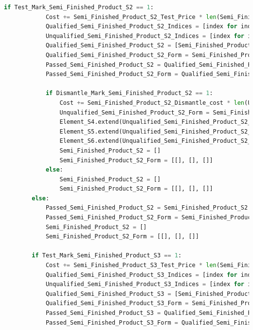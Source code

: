 \documentclass[withoutpreface,bwprint]{cumcmthesis} %
\begin{document}
\begin{appendices}
\begin{lstlisting}[language=python]
		if Test_Mark_Semi_Finished_Product_S2 == 1:
			Cost += Semi_Finished_Product_S2_Test_Price * len(Semi_Finished_Product_S2)
			Qualified_Semi_Finished_Product_S2_Indices = [index for index, value in enumerate(Semi_Finished_Product_S2) if value == 1]
			Unqualified_Semi_Finished_Product_S2_Indices = [index for index, value in enumerate(Semi_Finished_Product_S2) if value == 0]
			Qualified_Semi_Finished_Product_S2 = [Semi_Finished_Product_S2[i] for i in range(len(Semi_Finished_Product_S2)) if i in Qualified_Semi_Finished_Product_S2_Indices]
			Qualified_Semi_Finished_Product_S2_Form = Semi_Finished_Product_S2_Form[:, Qualified_Semi_Finished_Product_S2_Indices]
			Passed_Semi_Finished_Product_S2 = Qualified_Semi_Finished_Product_S2
			Passed_Semi_Finished_Product_S2_Form = Qualified_Semi_Finished_Product_S2_Form
	
			if Dismantle_Mark_Semi_Finished_Product_S2 == 1:
				Cost += Semi_Finished_Product_S2_Dismantle_cost * len(Unqualified_Semi_Finished_Product_S2_Indices)
				Unqualified_Semi_Finished_Product_S2_Form = Semi_Finished_Product_S2_Form[:, Unqualified_Semi_Finished_Product_S2_Indices]
				Element_S4.extend(Unqualified_Semi_Finished_Product_S2_Form[0])
				Element_S5.extend(Unqualified_Semi_Finished_Product_S2_Form[1])
				Element_S6.extend(Unqualified_Semi_Finished_Product_S2_Form[2])
				Semi_Finished_Product_S2 = []
				Semi_Finished_Product_S2_Form = [[], [], []]
			else:
				Semi_Finished_Product_S2 = []
				Semi_Finished_Product_S2_Form = [[], [], []]
		else:
			Passed_Semi_Finished_Product_S2 = Semi_Finished_Product_S2
			Passed_Semi_Finished_Product_S2_Form = Semi_Finished_Product_S2_Form
			Semi_Finished_Product_S2 = []
			Semi_Finished_Product_S2_Form = [[], [], []]
	
		if Test_Mark_Semi_Finished_Product_S3 == 1:
			Cost += Semi_Finished_Product_S3_Test_Price * len(Semi_Finished_Product_S3)
			Qualified_Semi_Finished_Product_S3_Indices = [index for index, value in enumerate(Semi_Finished_Product_S3) if value == 1]
			Unqualified_Semi_Finished_Product_S3_Indices = [index for index, value in enumerate(Semi_Finished_Product_S3) if value == 0]
			Qualified_Semi_Finished_Product_S3 = [Semi_Finished_Product_S3[i] for i in range(len(Semi_Finished_Product_S3)) if i in Qualified_Semi_Finished_Product_S3_Indices]
			Qualified_Semi_Finished_Product_S3_Form = Semi_Finished_Product_S3_Form[:, Qualified_Semi_Finished_Product_S3_Indices]
			Passed_Semi_Finished_Product_S3 = Qualified_Semi_Finished_Product_S3
			Passed_Semi_Finished_Product_S3_Form = Qualified_Semi_Finished_Product_S3_Form
	

\end{lstlisting}
\end{appendices}
\end{document}
